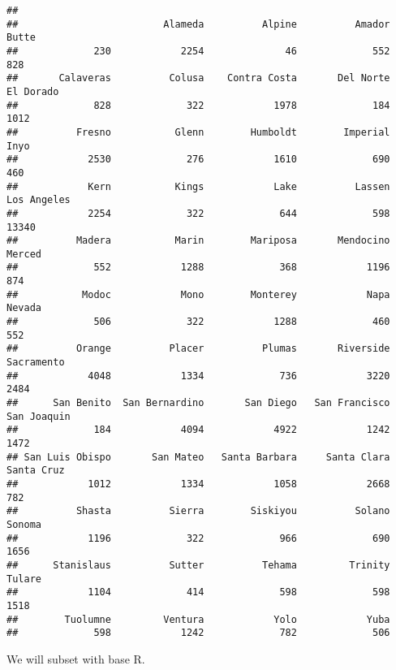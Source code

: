 \documentclass[
]{article}
\newenvironment{Shaded}{\begin{snugshade}}{\end{snugshade}}
\newcommand{\FunctionTok}[1]{\textcolor[rgb]{0.00,0.00,0.00}{#1}}
\newcommand{\NormalTok}[1]{#1}
\newcommand{\OtherTok}[1]{\textcolor[rgb]{0.56,0.35,0.01}{#1}}
\newcommand{\SpecialCharTok}[1]{\textcolor[rgb]{0.00,0.00,0.00}{#1}}
\newcommand{\StringTok}[1]{\textcolor[rgb]{0.31,0.60,0.02}{#1}}
\begin{document}
\begin{verbatim}
## 
##                         Alameda          Alpine          Amador           Butte 
##             230            2254              46             552             828 
##       Calaveras          Colusa    Contra Costa       Del Norte       El Dorado 
##             828             322            1978             184            1012 
##          Fresno           Glenn        Humboldt        Imperial            Inyo 
##            2530             276            1610             690             460 
##            Kern           Kings            Lake          Lassen     Los Angeles 
##            2254             322             644             598           13340 
##          Madera           Marin        Mariposa       Mendocino          Merced 
##             552            1288             368            1196             874 
##           Modoc            Mono        Monterey            Napa          Nevada 
##             506             322            1288             460             552 
##          Orange          Placer          Plumas       Riverside      Sacramento 
##            4048            1334             736            3220            2484 
##      San Benito  San Bernardino       San Diego   San Francisco     San Joaquin 
##             184            4094            4922            1242            1472 
## San Luis Obispo       San Mateo   Santa Barbara     Santa Clara      Santa Cruz 
##            1012            1334            1058            2668             782 
##          Shasta          Sierra        Siskiyou          Solano          Sonoma 
##            1196             322             966             690            1656 
##      Stanislaus          Sutter          Tehama         Trinity          Tulare 
##            1104             414             598             598            1518 
##        Tuolumne         Ventura            Yolo            Yuba 
##             598            1242             782             506
\end{verbatim}

We will subset with base R.

\begin{Shaded}
\end{Shaded}
\end{document}
